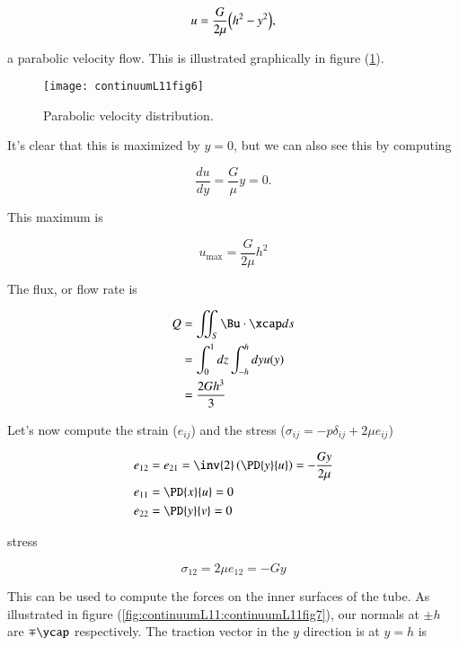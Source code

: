 \begin{equation}\label{eqn:continuumL11:690}
u = \frac{G}{2 \mu} \Bigl( h^2 - y^2 \Bigr),
\end{equation}

a parabolic velocity flow.  This is illustrated graphically in figure (\ref{fig:continuumL11:continuumL11fig6}).

\begin{figure}[htp]
   \centering
   \texttt{[image: continuumL11fig6]}
   \caption{Parabolic velocity distribution.}\label{fig:continuumL11:continuumL11fig6}
\end{figure}

It's clear that this is maximized by $y = 0$, but we can also see this by computing

\begin{equation}\label{eqn:continuumL11:710}
\frac{du}{dy} = \frac{G}{\mu} y = 0.
\end{equation}

This maximum is

\begin{equation}\label{eqn:continuumL11:850}
u_{\text{max}} = \frac{G}{2\mu} h^2
\end{equation}

The flux, or flow rate is

\begin{align*}
Q 
&= \iint_S \Bu \cdot \xcap ds \\
&= \int_0^1 dz \int_{-h}^h dy u(y) \\
&=
\frac{2 G h^3}{3}
\end{align*}

Let's now compute the strain ($e_{ij}$) and the stress ($\sigma_{ij} = -p \delta_{ij} + 2 \mu e_{ij}$)

\begin{align}\label{eqn:continuumL11:730}
e_{12} &= e_{21} = \inv{2} \left( \PD{y}{u} \right) = - \frac{G y}{2 \mu} \\
e_{11} &= \PD{x}{u} = 0 \\
e_{22} &= \PD{y}{v} = 0
\end{align}

stress

\begin{equation}\label{eqn:continuumL11:750}
\sigma_{12} = 2 \mu e_{12} = -G y
\end{equation}

This can be used to compute the forces on the inner surfaces of the tube.  As illustrated in figure (\ref{fig:continuumL11:continuumL11fig7}), our normals at $\pm h$ are $\mp \ycap$ respectively.  The traction vector in the $y$ direction is at $y = h$ is

